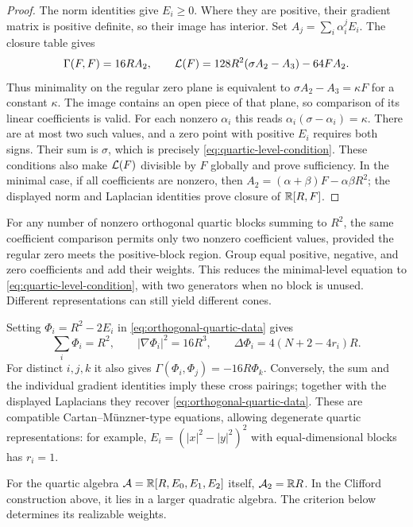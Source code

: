 \begin{proof}
The norm identities give $E_i\geq0$. Where they are positive,
their gradient matrix is positive definite, so their image has
interior. Set $A_j=\sum_i\alpha_i^jE_i$. The closure table gives
\[
 \Gamma(F,F)=16RA_2,\qquad
 \mathcal L(F)=128R^2(\sigma A_2-A_3)-64FA_2.
\]
Thus minimality on the regular zero plane is equivalent to
$\sigma A_2-A_3=\kappa F$ for a constant $\kappa$. The image contains
an open piece of that plane, so comparison of its linear coefficients
is valid. For each nonzero $\alpha_i$ this reads
$\alpha_i(\sigma-\alpha_i)=\kappa$. There are at most two such
values, and a zero point with positive $E_i$ requires both signs.
Their sum is $\sigma$, which is precisely
\eqref{eq:quartic-level-condition}. These conditions also make
$\mathcal L(F)$ divisible by $F$ globally and prove sufficiency.
In the minimal case, if all coefficients are nonzero, then
$A_2=(\alpha+\beta)F-\alpha\beta R^2$; the displayed norm and
Laplacian identities prove closure of $\mathbb R[R,F]$.
\end{proof}

\begin{remark}\label{rem:quartic-many-blocks}
For any number of nonzero orthogonal quartic blocks summing to $R^2$,
the same coefficient comparison permits only two nonzero coefficient
values, provided the regular zero meets the positive-block region.
Group equal positive, negative, and zero coefficients and add their
weights. This reduces the minimal-level equation to
\eqref{eq:quartic-level-condition}, with two generators when no block
is unused. Different representations can still yield different cones.
\end{remark}

\begin{remark}
\label{rem:compatible-quartic-CM}
Setting $\Phi_i=R^2-2E_i$ in \eqref{eq:orthogonal-quartic-data} gives
\[
 \sum_i\Phi_i=R^2,\qquad |\nabla\Phi_i|^2=16R^3,\qquad
 \Delta\Phi_i=4(N+2-4r_i)R.
\]
For distinct $i,j,k$ it also gives
$\Gamma(\Phi_i,\Phi_j)=-16R\Phi_k$.
Conversely, the sum and the individual gradient identities imply
these cross pairings; together with the displayed Laplacians they
recover \eqref{eq:orthogonal-quartic-data}.
These are compatible Cartan--M\"unzner-type equations, allowing
degenerate quartic representations: for example,
$E_i=(|x|^2-|y|^2)^2$ with equal-dimensional blocks has $r_i=1$.
\end{remark}

For the quartic algebra $\mathcal A=\mathbb R[R,E_0,E_1,E_2]$ itself,
$\mathcal A_2=\mathbb R R$. In the Clifford construction above, it lies in a
larger quadratic algebra. The criterion below determines its
realizable weights.

